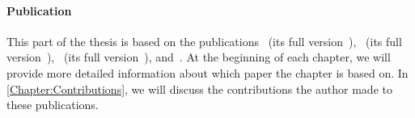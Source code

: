 \documentclass[../../diss.tex]{subfiles}
\begin{document}
\paragraph{Publication}

This part of the thesis is based on the publications~\cite{HolikMM16} (\resp its full version~\cite{HolikMM16a}),~\cite{HagueMM17} (\resp its full version~\cite{HagueMM17a}),~\cite{MeyerMZ18} (\resp its full version~\cite{MeyerMZ18a}), and~\cite{MeyerMN17a}.
At the beginning of each chapter, we will provide more detailed information about which paper the chapter is based on.
In \cref{Chapter:Contributions}, we will discuss the contributions the author made to these publications.
\end{document}
